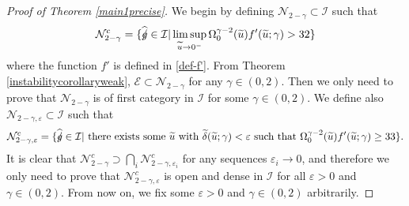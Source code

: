 \documentclass[11pt,reqno]{amsart}
\theoremstyle{definition}
\numberwithin{equation}{section}
\newcommand{\tdelta}{\widetilde{\delta}}
\newcommand{\tu}{\widetilde{u}}
\def\gs{\mbox{$g \mkern -9mu /$}}
\begin{document}
\begin{proof}[Proof of Theorem \ref{main1precise}]
We begin by defining $\mathcal{N}_{2-\gamma}\subset\mathcal{I}$ such that
\begin{align*}
\mathcal{N}_{2-\gamma}^c=\{\widehat{\gs}\in\mathcal{I}|\limsup_{\tu\to0^-}\Omega_0^{\gamma-2}(\tu)f'(\tu;\gamma)>32\}
\end{align*}
where the function $f'$ is defined in \eqref{def-f'}.  From Theorem \ref{instabilitycorollaryweak}, $\mathcal{E}\subset\mathcal{N}_{2-\gamma}$ for any $\gamma\in(0,2)$. Then we only need to prove that $\mathcal{N}_{2-\gamma}$ is of first category in $\mathcal{I}$ for some $\gamma\in(0,2)$. We define also $\mathcal{N}_{2-\gamma,\varepsilon}\subset\mathcal{I}$ such that \begin{align*}
\mathcal{N}_{2-\gamma,\varepsilon}^c=\{\widehat{\gs}\in\mathcal{I}|\text{ there exists some $\tu$ with $\tdelta(\tu;\gamma)<\varepsilon$ such that }\Omega_0^{\gamma-2}(\tu)f'(\tu;\gamma)\ge33\}.
\end{align*}
It is clear that $\mathcal{N}_{2-\gamma}^c\supset\bigcap_{i}\mathcal{N}^c_{2-\gamma,\varepsilon_i}$ for any sequences $\varepsilon_i\to0$, and therefore we only need to prove that $\mathcal{N}_{2-\gamma,\varepsilon}^c$ is open and dense in $\mathcal{I}$ for all $\varepsilon>0$ and $\gamma\in(0,2)$. From now on, we fix some $\varepsilon>0$ and $\gamma\in(0,2)$ arbitrarily.


\end{proof}
\end{document}
